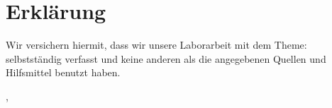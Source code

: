 
\thispagestyle{empty}

\section*{Erklärung}
\vspace*{20em}

Wir versichern hiermit, dass wir unsere Laborarbeit mit dem Theme: {\titel}  selbstständig verfasst und keine anderen als die angegebenen Quellen und Hilfsmittel benutzt haben.


\vspace{3em}

\abgabeort, \datumAbgabe
\vspace{4em}

\autor
